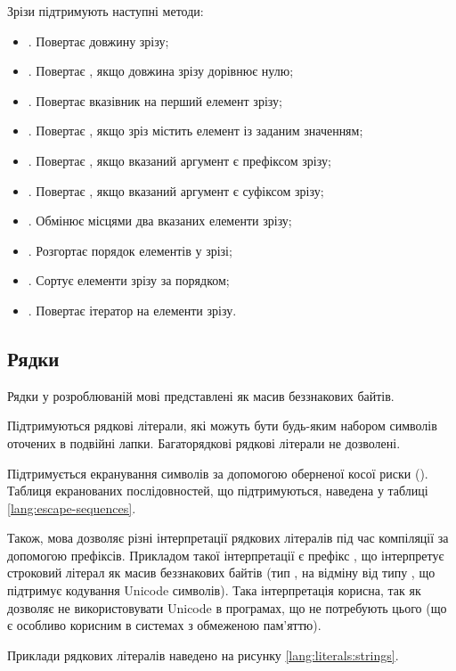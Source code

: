 \documentclass[main.tex]{subfiles}
\begin{document}
Зрізи підтримують наступні методи:
\begin{itemize}
\item {}. Повертає довжину зрізу;
\item {}. Повертає , якщо довжина зрізу дорівнює нулю;
\item {}. Повертає вказівник на перший елемент зрізу;
\item {}. Повертає , якщо зріз містить елемент із заданим значенням;
\item {}. Повертає , якщо вказаний аргумент є префіксом зрізу;
\item {}. Повертає , якщо вказаний аргумент є суфіксом зрізу;
\item {}. Обмінює місцями два вказаних елементи зрізу;
\item {}. Розгортає порядок елементів у зрізі;
\item {}. Сортує елементи зрізу за порядком;
\item {}. Повертає ітератор на елементи зрізу.
\end{itemize}

\FloatBarrier
\subsection{Рядки}
Рядки у розроблюваній мові представлені як масив беззнакових байтів.

Підтримуються рядкові літерали, які можуть бути будь-яким набором символів оточених в подвійні лапки.
Багаторядкові рядкові літерали не дозволені.

Підтримується екранування символів за допомогою оберненої косої риски (\code{\textbackslash}).
Таблиця екранованих послідовностей, що підтримуються, наведена у таблиці \ref{lang:escape-sequences}.

Також, мова дозволяє різні інтерпретації рядкових літералів під час компіляції за допомогою префіксів.
Прикладом такої інтерпретації є префікс , що інтерпретує строковий літерал як масив беззнакових байтів (тип , на відміну від типу , що підтримує кодування Unicode символів).
Така інтерпретація корисна, так як дозволяє не використовувати Unicode в програмах, що не потребують цього (що є особливо корисним в системах з обмеженою пам'яттю).

Приклади рядкових літералів наведено на рисунку \ref{lang:literals:strings}.
\end{document}
